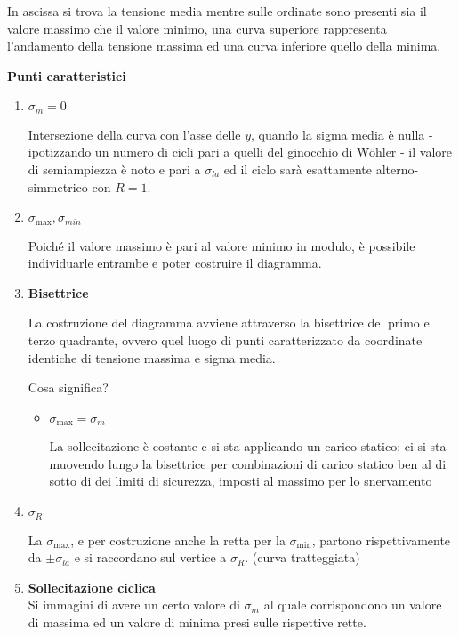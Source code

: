 \documentclass{article}
\begin{document}
\begin{adjustwidth}{2in}{}
			In ascissa si trova la tensione media mentre sulle ordinate sono presenti sia il valore massimo che il valore minimo, una curva superiore rappresenta l'andamento della tensione massima ed una curva inferiore quello della minima. \newline
			
			\textbf{Punti caratteristici}
			\begin{enumerate}
				\item \(\sigma_m = 0\) 
				
				Intersezione della curva con l'asse delle $y$, quando la sigma media è nulla  - ipotizzando un numero di cicli pari a quelli del ginocchio di Wöhler - il valore di semiampiezza è noto e pari a $\sigma_{la}$ ed il ciclo sarà esattamente alterno-simmetrico con $R=1$. 
				
				\item \(\sigma_{\max}, \sigma_{min}\)
				
				Poiché il valore massimo è pari al valore minimo in modulo, è possibile individuarle entrambe e poter costruire il diagramma. 
				
				
				\item \textbf{Bisettrice}
				
				La costruzione del diagramma avviene attraverso la bisettrice del primo e terzo quadrante, ovvero quel luogo di punti caratterizzato da coordinate identiche di tensione massima e sigma media.
				
				Cosa significa? 
				
				\begin{itemize}
					\item \(\sigma_{\max} = \sigma_m\)
					
					La sollecitazione è costante e si sta applicando un carico statico: ci si sta muovendo lungo la bisettrice per combinazioni di carico statico ben al di sotto di dei limiti di sicurezza, imposti al massimo per lo snervamento
				\end{itemize}
				
				\item \(\sigma_R\)
				
				La $\sigma_{\max}$, e per costruzione anche la retta per la $\sigma_{\min}$, partono rispettivamente da $\pm\sigma_{la}$ e si raccordano sul vertice a $\sigma_R$. (curva tratteggiata)
				
				\item \textbf{Sollecitazione ciclica}\\
				Si immagini di avere un certo valore di $\sigma_m$ al quale corrispondono un valore di massima ed un valore di minima presi sulle rispettive rette. 
				

\end{enumerate}
\end{adjustwidth}
\end{document}
